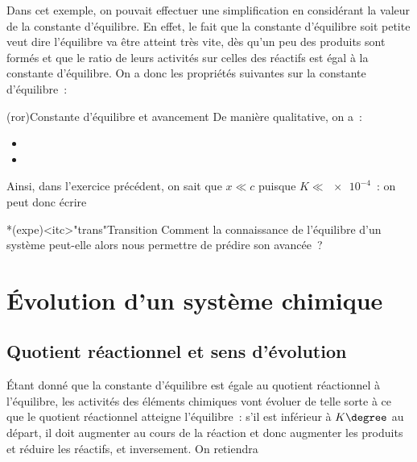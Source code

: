 \documentclass[../../main/main.tex]{subfiles}
\begin{document}
Dans cet exemple, on pouvait effectuer une simplification en considérant la
valeur de la constante d'équilibre. En effet, le fait que la constante
d'équilibre soit petite veut dire l'équilibre va être atteint très vite, dès
qu'un peu des produits sont formés et que le ratio de leurs activités sur celles
des réactifs est égal à la constante d'équilibre. On a donc les propriétés
suivantes sur la constante d'équilibre~:

\begin{tcb}[label=prop:K](ror){Constante d'équilibre et avancement}
	De manière qualitative, on a~:
	\begin{itemize}
		\item {}
		\item {}
	\end{itemize}
\end{tcb}

Ainsi, dans l'exercice précédent, on sait que $x \ll c$ puisque $K \ll
	\num{e-4}$~: on peut donc écrire
\csw{
\[
	K = \frac{x_f{}^2}{c}
	\Lra
	x_f = \sqrt{Kc} = \SI{1.33e-3}{mol.L^{-1}}
\]
}

\begin{tcb}*(expe)<itc>"trans"{Transition}
	Comment la connaissance de l'équilibre d'un système peut-elle alors nous
	permettre de prédire son avancée~?
\end{tcb}

\section{Évolution d'un système chimique}
\subsection{Quotient réactionnel et sens d'évolution}

Étant donné que la constante d'équilibre est égale au quotient réactionnel à
l'équilibre, les activités des éléments chimiques vont évoluer de telle sorte à
ce que le quotient réactionnel atteigne l'équilibre~: s'il est inférieur à
$K\degree$ au départ, il doit augmenter au cours de la réaction et donc
augmenter les produits et réduire les réactifs, et inversement. On retiendra
\end{document}
